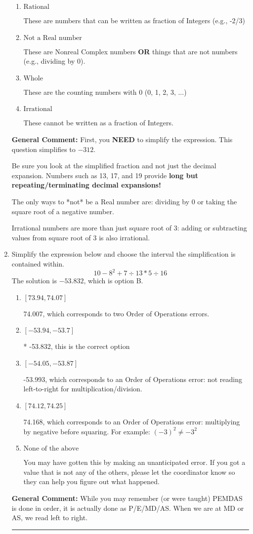 \documentclass{extbook}[14pt]
\newcommand{\litem}[1]{\item #1

\rule{\textwidth}{0.4pt}}
\begin{document}
\begin{enumerate}
{\begin{enumerate}[label=\Alph*.]
* This is the correct option!
\item \( \text{Rational} \)

These are numbers that can be written as fraction of Integers (e.g., -2/3)
\item \( \text{Not a Real number} \)

These are Nonreal Complex numbers \textbf{OR} things that are not numbers (e.g., dividing by 0).
\item \( \text{Whole} \)

These are the counting numbers with 0 (0, 1, 2, 3, ...)
\item \( \text{Irrational} \)

These cannot be written as a fraction of Integers.
\end{enumerate}

\textbf{General Comment:} First, you \textbf{NEED} to simplify the expression. This question simplifies to $-312$. 
 
 Be sure you look at the simplified fraction and not just the decimal expansion. Numbers such as 13, 17, and 19 provide \textbf{long but repeating/terminating decimal expansions!} 
 
 The only ways to *not* be a Real number are: dividing by 0 or taking the square root of a negative number. 
 
 Irrational numbers are more than just square root of 3: adding or subtracting values from square root of 3 is also irrational.
}
\litem{
Simplify the expression below and choose the interval the simplification is contained within.
\[ 10 - 8^2 + 7 \div 13 * 5 \div 16 \]
The solution is \( -53.832 \), which is option B.\begin{enumerate}[label=\Alph*.]
\item \( [73.94, 74.07] \)

 74.007, which corresponds to two Order of Operations errors.
\item \( [-53.94, -53.7] \)

* -53.832, this is the correct option
\item \( [-54.05, -53.87] \)

 -53.993, which corresponds to an Order of Operations error: not reading left-to-right for multiplication/division.
\item \( [74.12, 74.25] \)

 74.168, which corresponds to an Order of Operations error: multiplying by negative before squaring. For example: $(-3)^2 \neq -3^2$
\item \( \text{None of the above} \)

 You may have gotten this by making an unanticipated error. If you got a value that is not any of the others, please let the coordinator know so they can help you figure out what happened.
\end{enumerate}

\textbf{General Comment:} While you may remember (or were taught) PEMDAS is done in order, it is actually done as P/E/MD/AS. When we are at MD or AS, we read left to right.
}
\end{enumerate}
\end{document}
